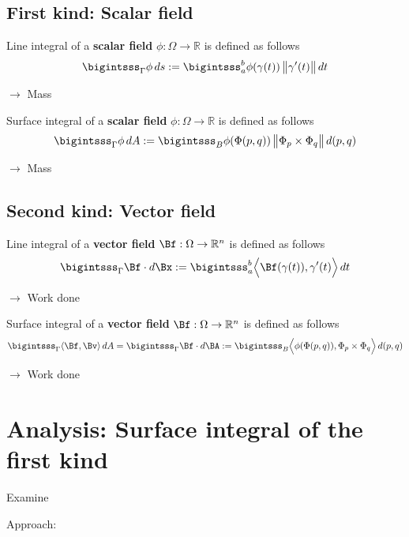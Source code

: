 \documentclass[12pt]{article}
\begin{document}
\subsection{First kind: Scalar field}
\begin{recallboxed}
	\label{recall:scalar}
	Line integral of a 
	\textbf{scalar field} $\phi: \Omega \to \mathbb{R}$ is defined as follows
	\begin{align}
		\bigintsss_{\Gamma} \phi \, ds 
		:= \bigintsss_{a}^{b} \phi(\gamma(t))  \, \big\| \gamma'(t) \big\| \, dt
	\end{align}
\end{recallboxed}
$\rightarrow$ Mass
\begin{recallboxed}
	\label{recall:scalarsurface}
	Surface integral of a 
	\textbf{scalar field} $\phi: \Omega \to \mathbb{R}$ is defined as follows
	\begin{align}
		\bigintsss_{\Gamma} \phi \, dA 
		:= \bigintsss_{B} \phi(\Phi(p,q)) \, \big\| \Phi_p \times \Phi_q \big\| \, d(p,q)
	\end{align}
\end{recallboxed}
$\rightarrow$ Mass
\subsection{Second kind: Vector field}
\begin{recallboxed}
	\label{recall:vectorsurface}
	Line integral of a \textbf{vector field} $\Bf: \Omega \to \mathbb{R}^{n}$ is defined as follows
	\begin{align}
		\bigintsss_{\Gamma} \Bf \cdot d\Bx 
		:= \bigintsss_{a}^{b}
		\Big\langle \Bf(\gamma(t)), \gamma'(t) \Big\rangle \, dt
	\end{align}
\end{recallboxed}
$\rightarrow$ Work done
\begin{recallboxed}
	\label{recall:vector}
	Surface integral of a \textbf{vector field} $\Bf: \Omega \to \mathbb{R}^{n}$ is defined as follows
	\begin{align}
		\bigintsss_{\Gamma} \langle \Bf, \Bv \rangle \, dA 
		= \bigintsss_{\Gamma} \Bf \cdot d\BA
		:= \bigintsss_{B}
		\Big\langle 
		\phi(\Phi(p,q)), \Phi_p \times \Phi_q
		\Big\rangle
		\, d(p,q)
	\end{align}
\end{recallboxed}
$\rightarrow$ Work done
\clearpage
\section{Analysis: Surface integral of the first kind}
\begin{exampleboxed}
	Examine
\end{exampleboxed}
Approach:
\end{document}
